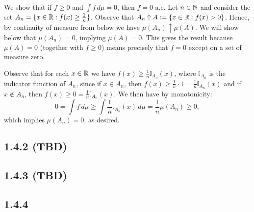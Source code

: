 \documentclass[11pt]{article}
\begin{document}
We show that if $f \geq 0$ and $\int f \, d\mu = 0$, then $f = 0$ a.e. Let $n \in {\mathbb N}$ and consider the set $A_n = \{x \in {\mathbb R} : f(x) \geq \frac{1}{n}\}$. Observe that $A_n \uparrow A := \{x \in {\mathbb R} : f(x) > 0\}$. Hence, by continuity of measure from below we have $\mu(A_n)\uparrow \mu(A)$. We will show below that $\mu(A_n) = 0$, implying $\mu(A) = 0$. This gives the result because $\mu(A) = 0$ (together with $f \geq 0$) means precisely that $f = 0$ except on a set of measure zero.

Observe that for each $x \in {\mathbb R}$ we have $f(x) \geq  \frac{1}{n} \mathbb{I}_{A_n}(x)$, where $\mathbb{I}_{A_n}$ is the indicator function of $A_n$, since if $x \in A_n$, then $f(x) \geq \frac{1}{n} \cdot 1 = \frac{1}{n}\mathbb{I}_{A_n}(x)$ and if $x \notin A_n$, then $f(x) \geq 0 = \frac{1}{n}\mathbb{I}_{A_n}(x)$. We then have by monotonicity: \[0 = \int f \, d\mu  \geq \int  \frac{1}{n}\mathbb{I}_{A_n}(x)\, d\mu  =  \frac{1}{n}\mu(A_n) \geq 0,\] which implies $\mu(A_n) = 0$, as desired.

\subsection*{1.4.2 (TBD)}






\subsection*{1.4.3 (TBD)}

\subsection*{1.4.4}
\end{document}
